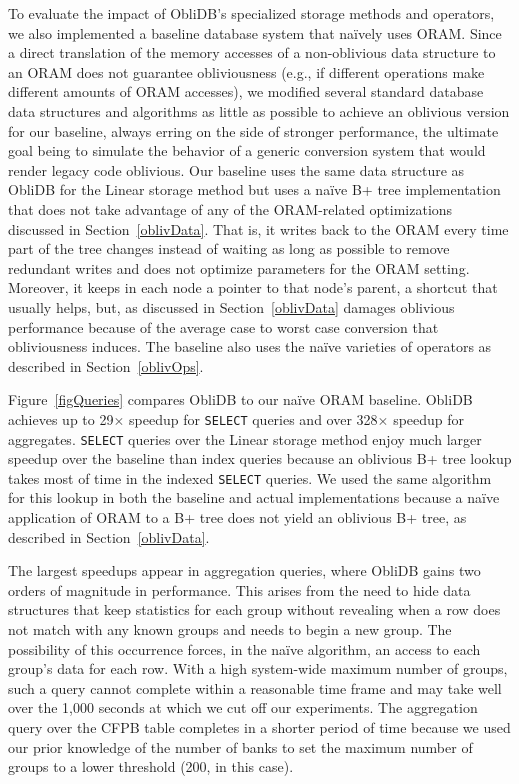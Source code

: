 \documentclass[letterpaper,twocolumn,10pt]{article}
\def\name/{ObliDB}
\begin{document}
To evaluate the impact of \name/'s specialized storage methods and operators, we also implemented a baseline database system that na\"ively uses ORAM. Since a direct translation of the memory accesses of a non-oblivious data structure to an ORAM does not guarantee obliviousness (e.g., if different operations make different amounts of ORAM accesses), we modified several standard database data structures and algorithms as little as possible to achieve an oblivious version for our baseline, always erring on the side of stronger performance, the ultimate goal being to simulate the behavior of a generic conversion system that would render legacy code oblivious. Our baseline uses the same data structure as \name/ for the Linear storage method but uses a na\"ive B+ tree implementation that does not take advantage of any of the ORAM-related optimizations discussed in Section~\ref{oblivData}. That is, it writes back to the ORAM every time part of the tree changes instead of waiting as long as possible to remove redundant writes and does not optimize parameters for the ORAM setting. Moreover, it keeps in each node a pointer to that node's parent, a shortcut that usually helps, but, as discussed in Section~\ref{oblivData} damages oblivious performance because of the average case to worst case conversion that obliviousness induces. The baseline also uses the na\"ive varieties of operators as described in Section~\ref{oblivOps}.

Figure~\ref{figQueries} compares \name/ to our na\"ive ORAM baseline. \name/ achieves up to 29$\times$ speedup for \texttt{SELECT} queries and over 328$\times$ speedup for aggregates. \texttt{SELECT} queries over the Linear storage method enjoy much larger speedup over the baseline than index queries because an oblivious B+ tree lookup takes most of time in the indexed \texttt{SELECT} queries. We used the same algorithm for this lookup in both the baseline and actual implementations because a na\"ive application of ORAM to a B+ tree does not yield an oblivious B+ tree, as described in Section~\ref{oblivData}.

The largest speedups appear in aggregation queries, where \name/ gains two orders of magnitude in performance. This arises from the need to hide data structures that keep statistics for each group without revealing when a row does not match with any known groups and needs to begin a new group. The possibility of this occurrence forces, in the na\"ive algorithm, an access to each group's data for each row. With a high system-wide maximum number of groups, such a query cannot complete within a reasonable time frame and may take well over the 1,000 seconds at which we cut off our experiments. The aggregation query over the CFPB table completes in a shorter period of time because we used our prior knowledge of the number of banks to set the maximum number of groups to a lower threshold (200, in this case).
\end{document}
